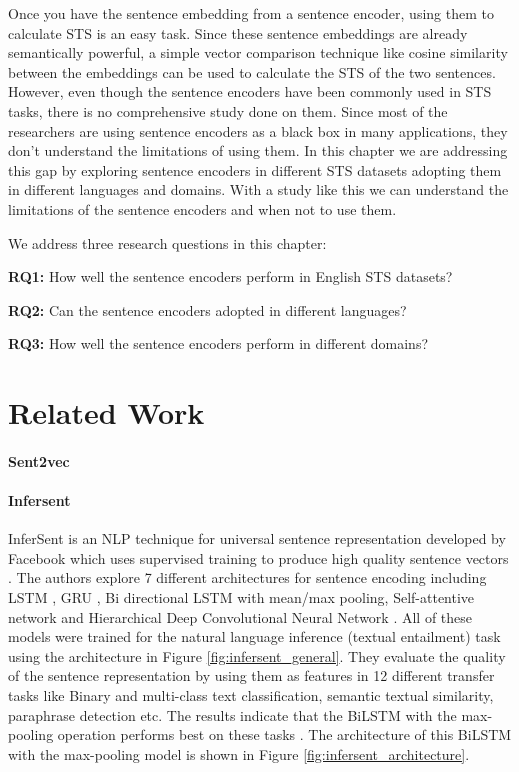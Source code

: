 Once you have the sentence embedding from a sentence encoder, using them to calculate STS is an easy task. Since these sentence embeddings are already semantically powerful, a simple vector comparison technique like cosine similarity between the embeddings can be used to calculate the STS of the two sentences. However, even though the sentence encoders have been commonly used in STS tasks, there is no comprehensive study done on them. Since most of the researchers are using sentence encoders as a black box in many applications, they don't understand the limitations of using them. In this chapter we are addressing this gap by exploring sentence encoders in different STS datasets adopting them in different languages and domains. With a study like this we can understand the limitations of the sentence encoders and when not to use them. 

We address three research questions in this chapter:

\textbf{RQ1:} How well the sentence encoders perform in English STS datasets?

\textbf{RQ2:} Can the sentence encoders adopted in different languages?

\textbf{RQ3:} How well the sentence encoders perform in different domains?

\section{Related Work}
\label{sec:sentence_related}

\paragraph{Sent2vec}
\cite{pagliardini-etal-2018-unsupervised}


\cite{lau-baldwin-2016-empirical}
\paragraph{Infersent}
InferSent is an NLP technique for universal sentence representation developed by Facebook which uses supervised training to produce high quality sentence vectors \cite{conneau-EtAl:2017:EMNLP2017}. The authors explore 7 different architectures for sentence
encoding including LSTM \cite{10.1162/neco.1997.9.8.1735}, GRU \cite{Chung2014EmpiricalEO}, Bi directional LSTM \cite{650093} with mean/max pooling, Self-attentive network and Hierarchical Deep Convolutional Neural Network \cite{conneau-EtAl:2017:EMNLP2017}. All of these models were trained for the natural language inference (textual entailment) task using the architecture in Figure \ref{fig:infersent_general}. They evaluate the quality of the sentence representation by using them as features in 12 different transfer tasks like Binary and multi-class text classification, semantic textual similarity, paraphrase detection etc. The results indicate that the BiLSTM with the max-pooling operation performs best on these tasks  \cite{conneau-EtAl:2017:EMNLP2017}. The architecture of this BiLSTM with the max-pooling model is shown in Figure \ref{fig:infersent_architecture}.

